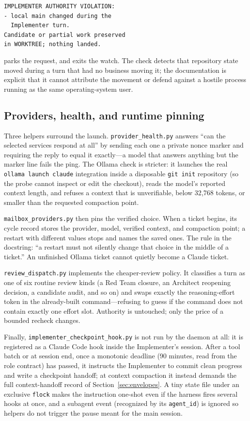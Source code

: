 \documentclass[10pt,aps,prd,twocolumn,nofootinbib]{revtex4-2}
\newcommand{\code}[1]{\texttt{#1}}
\newcommand{\file}[1]{\texttt{#1}}
\begin{document}
\begin{verbatim}
IMPLEMENTER AUTHORITY VIOLATION:
- local main changed during the
  Implementer turn.
Candidate or partial work preserved
in WORKTREE; nothing landed.
\end{verbatim}

\noindent parks the request, and exits the watch.  The check detects
that repository state moved during a turn that had no business moving
it; the documentation is explicit that it cannot attribute the
movement or defend against a hostile process running as the same
operating-system user.

\subsection{Providers, health, and runtime pinning}
\label{sec:providers}

Three helpers surround the launch.  \file{provider\_health.py} answers
``can the selected services respond at all'' by sending each one a
private nonce marker and requiring the reply to equal it exactly---a
model that answers anything but the marker line fails the ping.  The
Ollama check is stricter: it launches the real
\code{ollama launch claude} integration inside a disposable
\code{git init} repository (so the probe cannot inspect or edit the
checkout), reads the model's reported context length, and refuses a
context that is unverifiable, below 32{,}768 tokens, or smaller than
the requested compaction point.

\file{mailbox\_providers.py} then pins the verified choice.  When a
ticket begins, its cycle record stores the provider, model, verified
context, and compaction point; a restart with different values stops
and names the saved ones.  The rule in the docstring: ``a restart must
not silently change that choice in the middle of a ticket.''  An
unfinished Ollama ticket cannot quietly become a Claude ticket.

\file{review\_dispatch.py} implements the cheaper-review policy.  It
classifies a turn as one of six routine review kinds (a Red Team
closure, an Architect reopening decision, a candidate audit, and so
on) and swaps exactly the reasoning-effort token in the already-built
command---refusing to guess if the command does not contain exactly
one effort slot.  Authority is untouched; only the price of a
bounded recheck changes.

Finally, \file{implementer\_checkpoint\_hook.py} is not run by the
daemon at all: it is registered as a Claude Code hook inside the
Implementer's session.  After a tool batch or at session end, once a
monotonic deadline (90 minutes, read from the role contract) has
passed, it instructs the Implementer to commit clean progress and
write a checkpoint handoff; at context compaction it instead demands
the full context-handoff record of
Section~\ref{sec:envelopes}.  A tiny state file under an exclusive
\code{flock} makes the instruction one-shot even if the harness fires
several hooks at once, and a subagent event (recognized by its
\code{agent\_id}) is ignored so helpers do not trigger the pause meant
for the main session.
\end{document}
